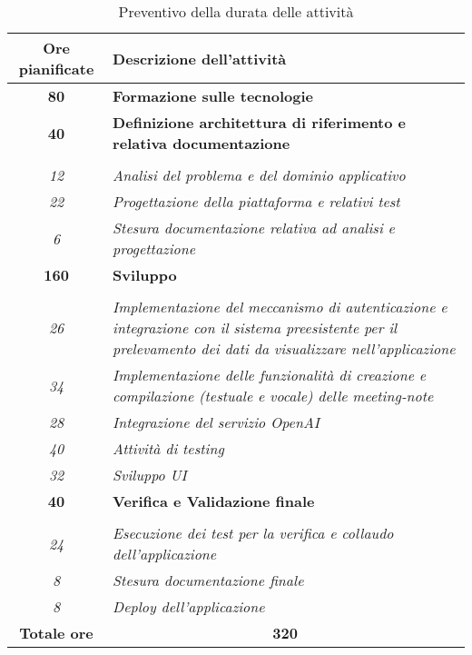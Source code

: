     \begin{table}
        \centering
        \begin{tabularx}{\textwidth}{|c|X|}
            \hline
            \textbf{Ore pianificate} & \textbf{Descrizione dell'attività} \\\hline
            
            \textbf{80} & \textbf{Formazione sulle tecnologie} \\	 
            \hline
            
            \textbf{40} & \textbf{Definizione architettura di riferimento e relativa documentazione} \\ \hdashline 
            \multirow{3}{0cm}\\ 
            \textit{12} & 
            \textit{Analisi del problema e del dominio applicativo} \\
            \textit{22} & 
            \textit{Progettazione della piattaforma e relativi test} \\
            \textit{6} & 
            \textit{Stesura documentazione relativa ad analisi e progettazione} \\
            \hline
            
    
            \textbf{160} & \textbf{Sviluppo}  \\ \hdashline 
            \multirow{5}{0cm}\\ 
            \textit{26} & 
            \textit{Implementazione del meccanismo di autenticazione e integrazione con il sistema preesistente per il prelevamento dei dati da visualizzare nell'applicazione} \\
            \textit{34} & 
            \textit{Implementazione delle funzionalità di creazione e compilazione (testuale e vocale) delle meeting-note} \\
            \textit{28} & 
            \textit{Integrazione del servizio OpenAI} \\
            \textit{40} & 
            \textit{Attività di testing} \\
            \textit{32} & 
            \textit{Sviluppo UI} \\
            \hline
            
            \textbf{40} & \textbf{Verifica e Validazione finale}  \\ \hdashline 
            \multirow{3}{0cm}\\ 
            \textit{24} & 
            \textit{Esecuzione dei test per la verifica e collaudo dell'applicazione} \\
            \textit{8} & 
            \textit{Stesura documentazione finale} \\
            \textit{8} & 
            \textit{Deploy dell'applicazione} \\
            \hline
            
            \textbf{Totale ore} & \multicolumn{1}{|c|}{\textbf{320}} \\ 
            \hline
            
        \end{tabularx}
        \caption{Preventivo della durata delle attività}
        \label{tab:preventivo-ore}
    \end{table}

